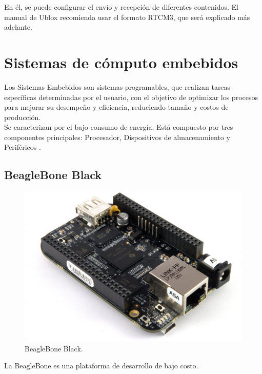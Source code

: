 En él, se puede configurar el envío y recepción de diferentes contenidos. El manual de Ublox recomienda usar el formato RTCM3, que será explicado más adelante.

\section{Sistemas de cómputo embebidos}

Los Sistemas Embebidos son sistemas programables, que realizan tareas específicas determinadas por el usuario, con el objetivo de optimizar los procesos para mejorar su desempeño y eficiencia, reduciendo tamaño y costos de producción. \\

Se caracterizan por el bajo consumo de energía. Está compuesto por tres componentes principales: Procesador, Dispositivos de almacenamiento y Periféricos \cite{caballero2014desarrollo}.

\subsection{BeagleBone Black}

\begin{figure}[ht]
\centering
\includegraphics[scale=0.18]{Figures/BeagleBoneBlack}
\caption[BeagleBone Black.]{BeagleBone Black\footnotemark.}
\label{fig:BBlack}
\end{figure}


La BeagleBone es una plataforma de desarrollo de bajo costo. \\

